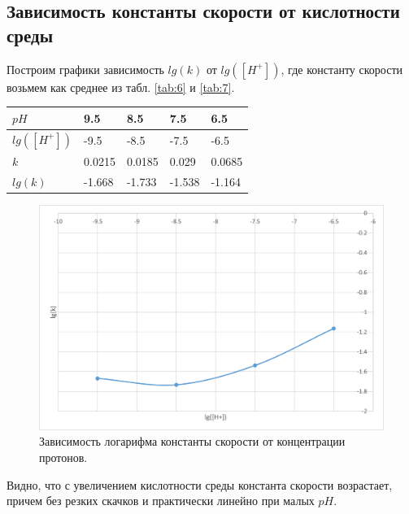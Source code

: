 \documentclass[a4paper,12pt]{article} %
\begin{document}
\subsection{Зависимость константы скорости от кислотности среды}

Построим графики зависимость $lg(k)$ от $lg([H^+])$, где константу скорости возьмем как среднее из табл. \ref{tab:6} и \ref{tab:7}.

\begin{table}[H]
    \centering
    \begin{tabular}{|l|l|l|l|l|}
    \hline
        $pH$ & 9.5 & 8.5 & 7.5 & 6.5 \\ \hline
        $lg([H^+])$ & -9.5 & -8.5 & -7.5 & -6.5 \\ \hline
        $k$ & 0.0215 & 0.0185 & 0.029 & 0.0685 \\ \hline
        $lg(k)$ & -1.668 & -1.733 & -1.538 & -1.164 \\ \hline
    \end{tabular}
\end{table}

\begin{figure}[H]
    \centering
    \includegraphics[scale=1]{Рисунок8.png}
    \caption{Зависимость логарифма константы скорости от концентрации протонов.
}
    \label{pic:8}
\end{figure}

Видно, что с увеличением кислотности среды константа скорости возрастает, причем без резких скачков и практически линейно при малых $pH$. 
\end{document}

